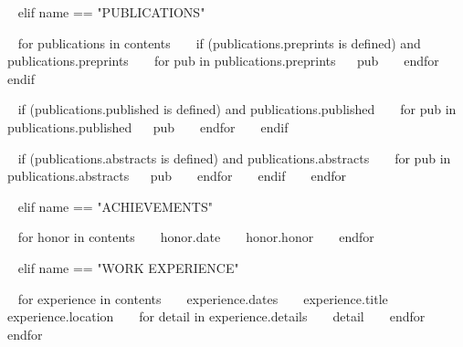 \begin{minipage}{\textwidth}
~{ elif name == "PUBLICATIONS" }~
\begin{entrylist}

~{ for publications in contents }~
  ~{ if (publications.preprints is defined) and publications.preprints }~
    ~{ for pub in publications.preprints}~
    \entry
      {}
      {~{{ pub }}~}
      {}
      {}
    ~{ endfor }~
  ~{ endif }~

  ~{ if (publications.published is defined) and publications.published }~
    ~{ for pub in publications.published}~
    \entry
      {}
      {~{{ pub }}~}
      {}
      {}
    ~{ endfor }~
  ~{ endif }~

  ~{ if (publications.abstracts is defined) and publications.abstracts }~
    ~{ for pub in publications.abstracts}~
    \entry
      {}
      {~{{ pub }}~}
      {}
      {}
    ~{ endfor }~
  ~{ endif }~
~{ endfor }~

\end{entrylist}


~{ elif name == "ACHIEVEMENTS" }~
\begin{entrylist}
  ~{ for honor in contents }~
    \entry
    {~{{ honor.date }}~}
    {~{{ honor.honor }}~}
    {}
    {}
  ~{ endfor }~
\end{entrylist}



~{ elif name == "WORK EXPERIENCE" }~
\begin{entrylist}
~{ for experience in contents }~
  \entry
    {~{{ experience.dates }}~}
    {~{{ experience.title }}~}
    {~{{ experience.location }}~}
    {~{ for detail in experience.details }~ ~{{ detail }}~ ~{ endfor }~}
~{ endfor }~
\end{entrylist}


\end{minipage}
